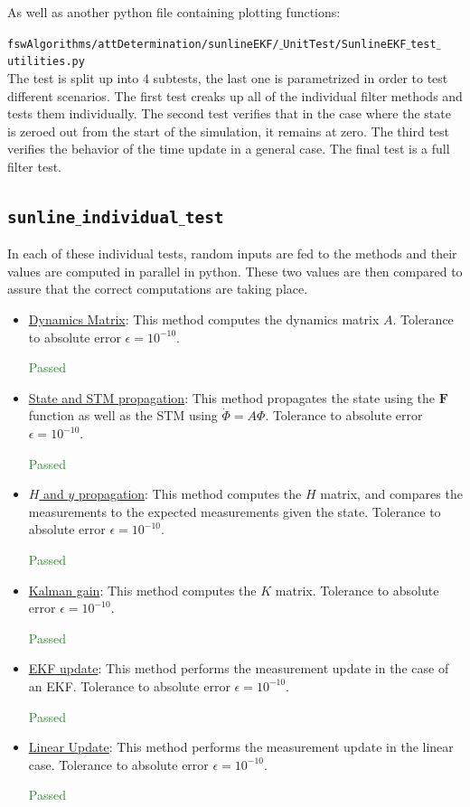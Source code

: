 \documentclass[]{BasiliskReportMemo}
\begin{document}
As well as another python file containing plotting functions:

\noindent
{\tt fswAlgorithms/attDetermination/sunlineEKF/$\_$UnitTest/SunlineEKF$\_$test$\_$utilities.py} \\

The test is split up into 4 subtests, the last one is parametrized in order to test different scenarios. The first test creaks up all of the individual filter methods and tests them individually. The second test verifies that in the case where the state is zeroed out from the start of the simulation, it remains at zero. The third test verifies the behavior of the time update in a general case. The final test is a full filter test.

\subsection{\texttt{sunline$\_$individual$\_$test}}

In each of these individual tests, random inputs are fed to the methods and their values are computed in parallel in python. These two values are then compared to assure that the correct computations are taking place. 
\begin{itemize}
\item \underline{Dynamics Matrix}: This method computes the dynamics matrix $A$. Tolerance to absolute error $\epsilon = 10^{-10}$.

\textcolor{ForestGreen}{Passed}
\item \underline{State and STM propagation}: This method propagates the state using the $\bm F$ function as well as the STM using $\dot{\Phi} = A \Phi$. Tolerance to absolute error $\epsilon = 10^{-10}$.

\textcolor{ForestGreen}{Passed}
\item \underline{$H$ and $y$ propagation}: This method computes the $H$ matrix, and compares the measurements to the expected measurements given the state. Tolerance to absolute error $\epsilon = 10^{-10}$.

\textcolor{ForestGreen}{Passed}
\item \underline{Kalman gain}: This method computes the $K$ matrix. Tolerance to absolute error $\epsilon = 10^{-10}$.

\textcolor{ForestGreen}{Passed}
\item \underline{EKF update}: This method performs the measurement update in the case of an EKF. Tolerance to absolute error $\epsilon = 10^{-10}$.

\textcolor{ForestGreen}{Passed}
\item \underline{Linear Update}: This method performs the measurement update in the linear case. Tolerance to absolute error $\epsilon = 10^{-10}$.

\textcolor{ForestGreen}{Passed}
\end{itemize}
\end{document}

